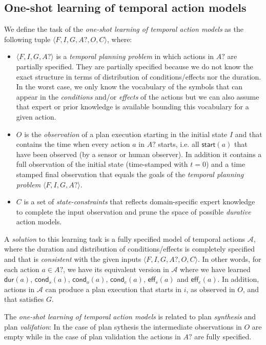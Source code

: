 \documentclass{ecai}
\newcommand{\tup}[1]{{\langle #1 \rangle}}
\newcommand{\eff}{\mathsf{eff}}    %
\newcommand{\cond}{\mathsf{cond}}  %
\newcommand{\dur}{\mathsf{dur}}    %
\newcommand{\start}{\mathsf{start}}%
\begin{document}
\subsection{One-shot learning of temporal action models}
We define the task of the {\em one-shot learning of temporal action models} as the following tuple $\tup{F,I,G,A?,O,C}$, where:

\begin{itemize}
\item $\tup{F,I,G,A?}$ is a {\em temporal planning problem} in which actions in $A?$ are partially specified. They are partially specified because we do not know the exact structure in terms of distribution of conditions/effects nor the duration. In the worst case, we only know the vocabulary of the symbols that can appear in the {\em conditions} and/or {\em effects} of the actions but we can also assume that expert or prior knowledge is available bounding this vocabulary for a given action.
\item $O$ is the {\em observation} of a plan execution starting in the initial state $I$ and that contains the time when every action $a$ in $A?$ starts, i.e. all $\start(a)$ that have been observed (by a sensor or human observer). In addition it contains a full observation of the initial state (time-stamped with $t=0$) and a time stamped final observation that equals the goals of the {\em temporal planning problem} $\tup{F,I,G,A?}$.  
\item $C$ is a set of {\em state-constraints} that reflects domain-specific expert knowledge to complete the input observation and prune the space of possible  {\em durative} action models.  
\end{itemize}

A {\em solution} to this learning task is a fully specified model of temporal actions $\mathcal{A}$, where the duration and distribution of conditions/effects is completely specified and that is {\em consistent} with the given inputs $\tup{F,I,G,A?,O,C}$. In other words, for each action $a \in A?$, we have its equivalent version in $\mathcal{A}$ where we have learned $\dur(a)$, $\cond_s(a)$, $\cond_o(a)$, $\cond_e(a)$, $\eff_s(a)$ and $\eff_e(a)$. In addition, actions in $\mathcal{A}$ can produce a plan execution that starts in $i$, as observed in $O$, and that satisfies $G$. 

The {\em one-shot learning of temporal action models} is related to plan {\em synthesis} and plan {\em valifation}: In the case of plan sythesis the intermediate observations in $O$ are empty while in the case of plan validation the actions in $A?$ are fully specified.
\end{document}
